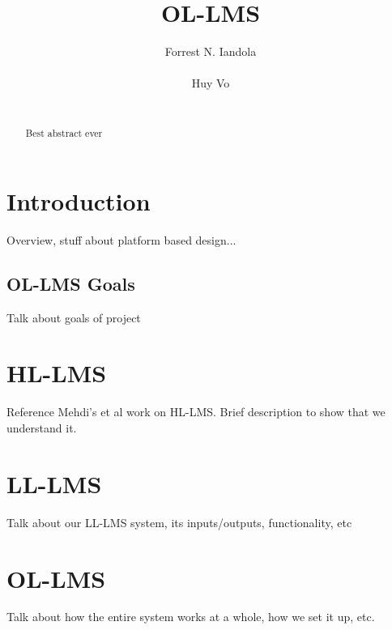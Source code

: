 \documentclass{acm_proc_article-sp}
\begin{document}
\title{OL-LMS}

\author{
\alignauthor
Forrest N. Iandola\\
       \\
\alignauthor
Huy Vo\\
       \\
}

\maketitle
\begin{abstract}
Best abstract ever
\end{abstract}


\section{Introduction}
Overview, stuff about platform based design...
\subsection{OL-LMS Goals}
Talk about goals of project
\section{HL-LMS}
Reference Mehdi's et al work on HL-LMS. Brief description to show that we understand it.
\section{LL-LMS}
Talk about our LL-LMS system, its inputs/outputs, functionality, etc
\section{OL-LMS}
Talk about how the entire system works at a whole, how we set it up, etc.
\end{document}
